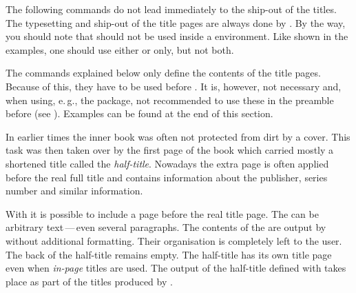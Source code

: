 The following commands do not lead immediately to the ship-out of the
titles. The typesetting and ship-out of the title pages are always done by
. By the way, you should note that  should
not be used inside a 
environment. Like shown in the examples, one should use
either  or  only, but not both.

The commands explained below only define the contents of the title
pages. Because of this, they have to be used before . It is,
however, not necessary and, when using, e.\,g., the 
package, not recommended to use these in the preamble
before  (see \cite{package:babel}). Examples
can be found at the end of this section.


\begin{Declaration}
\end{Declaration}%
%
\begin{Explain}%
  In earlier times the inner book was often not protected from dirt by a cover.
  This task was then taken over by the first page of the book which
  carried mostly a shortened title called the \emph{half-title}.
  Nowadays the extra page is often applied before the real full title
  and contains information about the publisher, series number and similar
  information.
\end{Explain}
With {\KOMAScript} it is possible to include a page before the real
title page.  The  can be arbitrary text\,---\,even
several paragraphs. The contents of the  are output
by {\KOMAScript} without additional formatting. Their organisation is
completely left to the user. The back of the half-title remains empty.
The half-title has its own title page even when \emph{in-page} titles
are used. The output of the half-title defined with 
takes place as part of the titles produced by .

